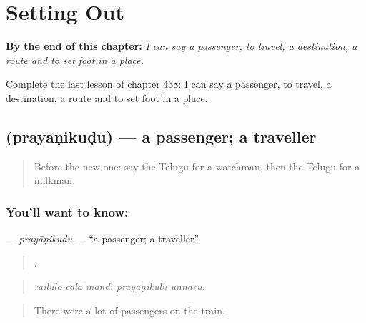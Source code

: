 
\chapter{Setting Out}
\label{ch:te-setting-out}

\begin{chapteropening}
\textbf{By the end of this chapter:} \emph{I can say a passenger, to travel, a destination, a route and to set foot in a place.}

Complete the last lesson of chapter 438: I can say a passenger, to travel, a destination, a route and to set foot in a place.
\end{chapteropening}

\section[\texorpdfstring{\te{ప్రయాణికుడు} (prayāṇikuḍu)}{ప్రయాణికుడు (prayāṇikuḍu)}]{ (prayāṇikuḍu) — a passenger; a traveller}

\label{lesson:TE-C438-prayanikudu}



\begin{quote}
Before the new one: say the Telugu for a watchman, then the Telugu for a milkman.
\end{quote}

\subsection*{You'll want to know: }
\textbf{} — \emph{prayāṇikuḍu} — \textquotedblleft{}a passenger; a traveller\textquotedblright{}.

\begin{quote}
    .
\end{quote}

\begin{quote}
\emph{railulō cālā mandi prayāṇikulu unnāru.}
\end{quote}

\begin{quote}
There were a lot of passengers on the train.
\end{quote}

